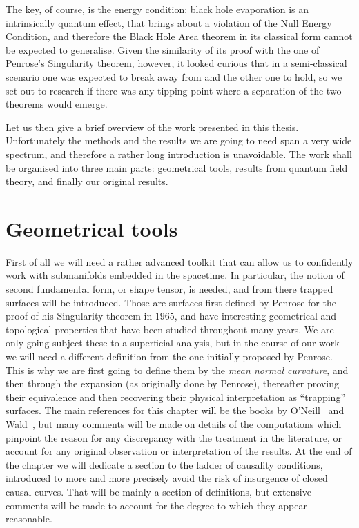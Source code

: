 The key, of course, is the energy condition: black hole evaporation is an intrinsically quantum effect, that brings about a violation of the Null Energy Condition, and therefore the Black Hole Area theorem in its classical form cannot be expected to generalise. Given the similarity of its proof with the one of Penrose's Singularity theorem, however, it looked curious that in a semi-classical scenario one was expected to break away from and the other one to hold, so we set out to research if there was any tipping point where a separation of the two theorems would emerge.

Let us then give a brief overview of the work presented in this thesis. Unfortunately the methods and the results we are going to need span a very wide spectrum, and therefore a rather long introduction is unavoidable. The work shall be organised into three main parts: geometrical tools, results from quantum field theory, and finally our original results.

\section{Geometrical tools}
First of all we will need a rather advanced toolkit that can allow us to confidently work with submanifolds embedded in the spacetime. In particular, the notion of second fundamental form, or shape tensor, is needed, and from there trapped surfaces will be introduced. Those are surfaces first defined by Penrose for the proof of his Singularity theorem in \(1965\), and have interesting geometrical and topological properties that have been studied throughout many years. We are only going subject these to a superficial analysis, but in the course of our work we will need a different definition from the one initially proposed by Penrose. This is why we are first going to define them by the \emph{mean normal curvature}, and then through the expansion (as originally done by Penrose), thereafter proving their equivalence and then recovering their physical interpretation as ``trapping'' surfaces.
The main references for this chapter will be the books by O'Neill~\cite[]{o1983semi} and Wald~\cite[]{wald2010general}, but many comments will be made on details of the computations which pinpoint the reason for any discrepancy with the treatment in the literature, or account for any original observation or interpretation of the results.
At the end of the chapter we will dedicate a section to the ladder of causality conditions, introduced to more and more precisely avoid the risk of insurgence of closed causal curves. That will be mainly a section of definitions, but extensive comments will be made to account for the degree to which they appear reasonable.  

